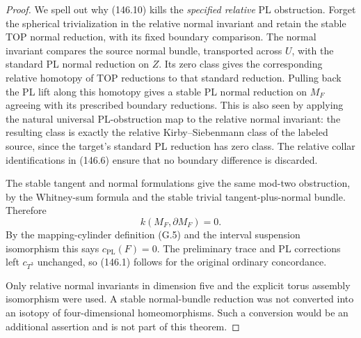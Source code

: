 \begin{proof}
We spell out why (146.10) kills the \emph{specified relative}
PL obstruction. Forget the spherical trivialization in the
relative normal invariant and retain the stable TOP normal
reduction, with its fixed boundary comparison. The normal
invariant compares the source normal bundle, transported across
$U$, with the standard PL normal reduction on $Z$. Its zero class
gives the corresponding relative homotopy of TOP reductions to
that standard reduction. Pulling back the PL lift along this
homotopy gives a stable PL normal reduction on $M_F$ agreeing
with its prescribed boundary reductions. This is also seen by
applying the natural universal PL-obstruction map to the
relative normal invariant: the resulting class is exactly the
relative Kirby--Siebenmann class of the labeled source, since
the target's standard PL reduction has zero class. The relative
collar identifications in (146.6) ensure that no boundary
difference is discarded.

The stable tangent and normal formulations give the same
mod-two obstruction, by the Whitney-sum formula and the stable
trivial tangent-plus-normal bundle. Therefore
\[
                  k(M_F,\partial M_F)=0.
 \tag{146.11}
\]
By the mapping-cylinder definition (G.5) and the interval
suspension isomorphism this says
$c_{\mathrm{PL}}(F)=0$. The preliminary trace and PL corrections
left $c_{T^3}$ unchanged, so (146.1) follows for the original
ordinary concordance.

Only relative normal invariants in dimension five and the
explicit torus assembly isomorphism were used. A stable
normal-bundle reduction was not converted into an isotopy of
four-dimensional homeomorphisms. Such a conversion would be an
additional assertion and is not part of this theorem.
\end{proof}

